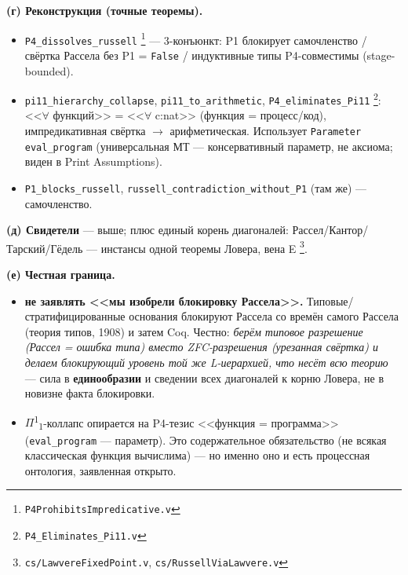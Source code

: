 \documentclass[11pt,a4paper]{article}
\begin{document}
\textbf{(г) Реконструкция (точные теоремы).}
\begin{itemize}
\item \texttt{P4\_\allowbreak{}dissolves\_\allowbreak{}russell} \footnote{\texttt{P4Prohibits\allowbreak{}Impredicative.v}} --- 3-конъюнкт: P1 блокирует самочленство / свёртка Рассела без P1 = \texttt{False} / индуктивные типы P4-совместимы (stage-bounded).
\item \texttt{pi11\_\allowbreak{}hierarchy\_\allowbreak{}collapse}, \texttt{pi11\_\allowbreak{}to\_\allowbreak{}arithmetic}, \texttt{P4\_\allowbreak{}eliminates\_\allowbreak{}Pi11} \footnote{\texttt{P4\_\allowbreak{}Eliminates\_\allowbreak{}Pi11.v}}: <<$\forall$ функций>> = <<$\forall$ c:nat>> (функция = процесс/код), импредикативная свёртка $\to$ арифметическая. Использует \texttt{Parameter eval\_\allowbreak{}program} (универсальная МТ --- консервативный параметр, не аксиома; виден в Print Assumptions).
\item \texttt{P1\_\allowbreak{}blocks\_\allowbreak{}russell}, \texttt{russell\_\allowbreak{}contradiction\_\allowbreak{}without\_\allowbreak{}P1} (там же) --- самочленство.
\end{itemize}

\textbf{(д) Свидетели} --- выше; плюс единый корень диагоналей: Рассел/Кантор/Тарский/Гёдель --- инстансы одной теоремы Ловера, вена E \footnote{\texttt{cs/\allowbreak{}Lawvere\allowbreak{}Fixed\allowbreak{}Point.v}, \texttt{cs/\allowbreak{}Russell\allowbreak{}Via\allowbreak{}Lawvere.v}}.

\textbf{(е) Честная граница.}
\begin{itemize}
\item \textbf{не заявлять <<мы изобрели блокировку Рассела>>.} Типовые/стратифицированные основания блокируют Рассела со времён самого Рассела (теория типов, 1908) и затем Coq. Честно: \emph{берём типовое разрешение (Рассел = ошибка типа) вместо ZFC-разрешения (урезанная свёртка) и делаем блокирующий уровень той же L-иерархией, что несёт всю теорию} --- сила в \textbf{единообразии} и сведении всех диагоналей к корню Ловера, не в новизне факта блокировки.
\item $\Pi$\textsuperscript{1}\textsubscript{1}-коллапс опирается на P4-тезис <<функция = программа>> (\texttt{eval\_\allowbreak{}program} --- параметр). Это содержательное обязательство (не всякая классическая функция вычислима) --- но именно оно и есть процессная онтология, заявленная открыто.
\end{itemize}
\end{document}
